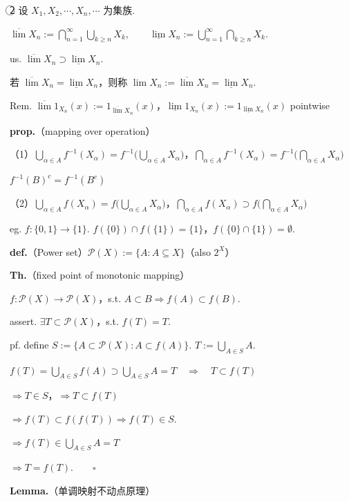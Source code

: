 \documentclass[11pt]{ctexart}
\theoremstyle{definition}
\begin{document}
 \textcircled{2}  设 $X_1, X_2, \cdots, X_n, \cdots$ 为集族.

$\overline{\lim} X_n := \bigcap_{n=1}^{\infty} \bigcup_{k \ge n} X_k, \qquad \underline{\lim} X_n := \bigcup_{n=1}^{\infty} \bigcap_{k \ge n} X_k.$

us. $\overline{\lim} X_n \supset \underline{\lim} X_n$.

若 $\overline{\lim} X_n = \underline{\lim} X_n$，则称 $\lim X_n := \overline{\lim} X_n = \underline{\lim} X_n$.

Rem. $\overline{\lim} 1_{X_n}(x) := 1_{\overline{\lim} X_n}(x)$，$\underline{\lim} 1_{X_n}(x) := 1_{\underline{\lim} X_n}(x)$  pointwise

\textbf{prop.}（mapping over operation）

（1）$\bigcup_{\alpha \in A} f^{-1}(X_\alpha) = f^{-1}\Big(\bigcup_{\alpha \in A} X_\alpha\Big)$，$\bigcap_{\alpha \in A} f^{-1}(X_\alpha) = f^{-1}\Big(\bigcap_{\alpha \in A} X_\alpha\Big)$

$f^{-1}(B)^c = f^{-1}(B^c)$

（2）$\bigcup_{\alpha \in A} f(X_\alpha) = f\Big(\bigcup_{\alpha \in A} X_\alpha\Big)$，$\bigcap_{\alpha \in A} f(X_\alpha) \supset f\Big(\bigcap_{\alpha \in A} X_\alpha\Big)$

eg. $f: \{0,1\} \to \{1\}$. $f(\{0\}) \cap f(\{1\}) = \{1\}$，$f(\{0\}\cap\{1\}) = \emptyset$.

\textbf{def.}（Power set）$\mathcal{P}(X) := \{A : A \subseteq X\}$（also $2^X$）

\textbf{Th.}（fixed point of monotonic mapping）

$f: \mathcal{P}(X) \to \mathcal{P}(X)$，s.t. $A \subset B \Rightarrow f(A) \subset f(B)$.

assert. $\exists T \subset \mathcal{P}(X)$，s.t. $f(T) = T$.

pf. define $S := \{A \subset \mathcal{P}(X) : A \subset f(A)\}$. $T := \bigcup_{A \in S} A$.

$f(T) = \bigcup_{A \in S} f(A) \supset \bigcup_{A \in S} A = T \quad \Rightarrow \quad T \subset f(T)$

$\Rightarrow T \in S$，$\Rightarrow T \subset f(T)$

$\Rightarrow f(T) \subset f(f(T)) \Rightarrow f(T) \in S.$

$\Rightarrow f(T) \in \bigcup_{A \in S} A = T$

$\Rightarrow T = f(T). \qquad \square$

\textbf{Lemma.}（单调映射不动点原理）
\end{document}
